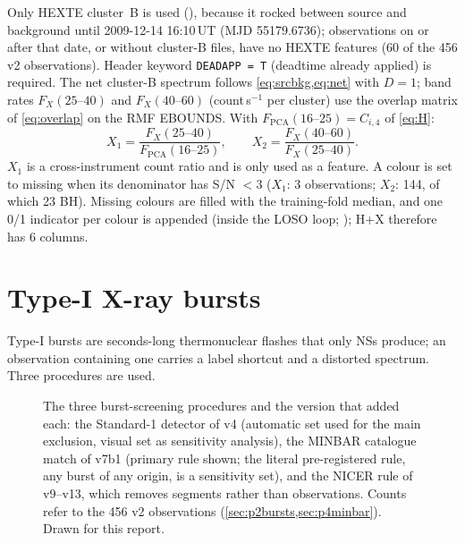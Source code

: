 Only HEXTE cluster~B is used (), because it rocked between source and background until
2009-12-14 16:10\,UT (MJD 55179.6736); observations on or after that date, or without cluster-B files, have no HEXTE
features (60 of the 456 v2 observations). Header keyword \texttt{DEADAPP = T} (deadtime already applied) is required.
The net cluster-B spectrum follows \cref{eq:srcbkg,eq:net} with $D=1$; band rates $F_X(25\text{--}40)$ and
$F_X(40\text{--}60)$ (count\,s$^{-1}$ per cluster) use the overlap matrix of \cref{eq:overlap} on the RMF EBOUNDS. With
$F_\mathrm{PCA}(16\text{--}25)=C_{i,4}$ of \cref{eq:H}:
\begin{equation}
X_1 = \frac{F_X(25\text{--}40)}{F_\mathrm{PCA}(16\text{--}25)},\qquad X_2 = \frac{F_X(40\text{--}60)}{F_X(25\text{--}40)} .\label{eq:hexte}
\end{equation}
$X_1$ is a cross-instrument count ratio and is only used as a feature. A colour is set to missing when its denominator
has S/N $<3$ ($X_1$: 3 observations; $X_2$: 144, of which 23 BH). Missing colours are filled with the training-fold
median, and one 0/1 indicator per colour is appended (inside the LOSO loop; ); H+X therefore has 6
columns.

\section{Type-I X-ray bursts}\label{sec:bursts}

Type-I bursts are seconds-long thermonuclear flashes that only NSs produce; an observation containing one carries a
label shortcut and a distorted spectrum. Three procedures are used.

\begin{figure}[htbp]
\centering

\caption[Burst screening]{The three burst-screening procedures and the version that added each: the Standard-1 detector of v4
(automatic set used for the main exclusion, visual set as sensitivity analysis), the MINBAR catalogue match of v7b1 (primary rule
shown; the literal pre-registered rule, any burst of any origin, is a sensitivity set), and the NICER rule of v9--v13, which removes
segments rather than observations. Counts refer to the 456 v2 observations (\cref{sec:p2bursts,sec:p4minbar}). Drawn for this
report.}
\label{fig:burstflow}
\end{figure}

